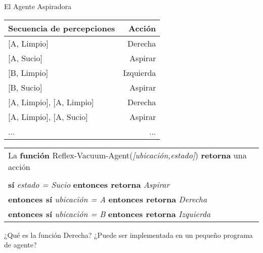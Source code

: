 \begin{frame}{El Agente Aspiradora}

\begin{center}
\def\arraystretch{1}
 \begin{tabular}{||l|r||} 
 \hline
 Secuencia de percepciones   & Acción \\
 \hline
 \hline
 \hspace{1em} [A, Limpio] \hspace{1em} & \hspace{1em} Derecha \\
 \hspace{1em} [A, Sucio] \hspace{1em} & \hspace{1em} Aspirar \\
 \hspace{1em} [B, Limpio] \hspace{1em} & \hspace{1em} Izquierda \\
 \hspace{1em} [B, Sucio] \hspace{1em} & \hspace{1em} Aspirar \\
 \hspace{1em} [A, Limpio], [A, Limpio] \hspace{1em} & \hspace{1em} Derecha \\
 \hspace{1em} [A, Limpio], [A, Sucio] \hspace{1em} & \hspace{1em} Aspirar \\ 
 ... & ... \\ [1ex]
 \hline
 \end{tabular}
\end{center}
\setlength{\arrayrulewidth}{0.3mm}
\begin{tabular}{|l|} 
 \hline
    La \textbf{función} Reflex-Vacuum-Agent(\textit{[ubicación,estado]}) \textbf{retorna} una acción \\
    \\
    \hspace{1em} \textbf{sí} \textit{estado = Sucio} \textbf{entonces retorna} \textit{Aspirar} \\
    \hspace{1em} \textbf{entonces sí} \textit{ubicación = A} \textbf{entonces retorna} \textit{Derecha} \\
    \hspace{1em} \textbf{entonces sí} \textit{ubicación = B} \textbf{entonces retorna} \textit{Izquierda} \\
 \hline
\end{tabular}
¿Qué es la función Derecha? \newline
¿Puede ser implementada en un pequeño programa de agente?
\end{frame}
